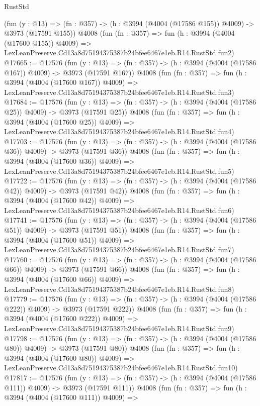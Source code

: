 \begin{lexlean}{RustStd}
\begin{coremodule}
    (fun (y : @13) => (fn : @357) -> (h : @3994 (@4004 (@17586 @155)) @4009) -> @3973 (@17591 @155))
    @4008
    (fun (fn : @357) =>
    fun (h : @3994 (@4004 (@17600 @155)) @4009) =>
    LexLeanPreserve.Cd13a8d75194375387b24bfee6467e1eb.R14.RustStd.fun2)
@17665 := @17576
    (fun (y : @13) => (fn : @357) -> (h : @3994 (@4004 (@17586 @167)) @4009) -> @3973 (@17591 @167))
    @4008
    (fun (fn : @357) =>
    fun (h : @3994 (@4004 (@17600 @167)) @4009) =>
    LexLeanPreserve.Cd13a8d75194375387b24bfee6467e1eb.R14.RustStd.fun3)
@17684 := @17576
    (fun (y : @13) => (fn : @357) -> (h : @3994 (@4004 (@17586 @25)) @4009) -> @3973 (@17591 @25))
    @4008
    (fun (fn : @357) =>
    fun (h : @3994 (@4004 (@17600 @25)) @4009) =>
    LexLeanPreserve.Cd13a8d75194375387b24bfee6467e1eb.R14.RustStd.fun4)
@17703 := @17576
    (fun (y : @13) => (fn : @357) -> (h : @3994 (@4004 (@17586 @36)) @4009) -> @3973 (@17591 @36))
    @4008
    (fun (fn : @357) =>
    fun (h : @3994 (@4004 (@17600 @36)) @4009) =>
    LexLeanPreserve.Cd13a8d75194375387b24bfee6467e1eb.R14.RustStd.fun5)
@17722 := @17576
    (fun (y : @13) => (fn : @357) -> (h : @3994 (@4004 (@17586 @42)) @4009) -> @3973 (@17591 @42))
    @4008
    (fun (fn : @357) =>
    fun (h : @3994 (@4004 (@17600 @42)) @4009) =>
    LexLeanPreserve.Cd13a8d75194375387b24bfee6467e1eb.R14.RustStd.fun6)
@17741 := @17576
    (fun (y : @13) => (fn : @357) -> (h : @3994 (@4004 (@17586 @51)) @4009) -> @3973 (@17591 @51))
    @4008
    (fun (fn : @357) =>
    fun (h : @3994 (@4004 (@17600 @51)) @4009) =>
    LexLeanPreserve.Cd13a8d75194375387b24bfee6467e1eb.R14.RustStd.fun7)
@17760 := @17576
    (fun (y : @13) => (fn : @357) -> (h : @3994 (@4004 (@17586 @66)) @4009) -> @3973 (@17591 @66))
    @4008
    (fun (fn : @357) =>
    fun (h : @3994 (@4004 (@17600 @66)) @4009) =>
    LexLeanPreserve.Cd13a8d75194375387b24bfee6467e1eb.R14.RustStd.fun8)
@17779 := @17576
    (fun (y : @13) => (fn : @357) -> (h : @3994 (@4004 (@17586 @222)) @4009) -> @3973 (@17591 @222))
    @4008
    (fun (fn : @357) =>
    fun (h : @3994 (@4004 (@17600 @222)) @4009) =>
    LexLeanPreserve.Cd13a8d75194375387b24bfee6467e1eb.R14.RustStd.fun9)
@17798 := @17576
    (fun (y : @13) => (fn : @357) -> (h : @3994 (@4004 (@17586 @80)) @4009) -> @3973 (@17591 @80))
    @4008
    (fun (fn : @357) =>
    fun (h : @3994 (@4004 (@17600 @80)) @4009) =>
    LexLeanPreserve.Cd13a8d75194375387b24bfee6467e1eb.R14.RustStd.fun10)
@17817 := @17576
    (fun (y : @13) => (fn : @357) -> (h : @3994 (@4004 (@17586 @111)) @4009) -> @3973 (@17591 @111))
    @4008
    (fun (fn : @357) =>
    fun (h : @3994 (@4004 (@17600 @111)) @4009) =>

\end{coremodule}
\end{lexlean}
